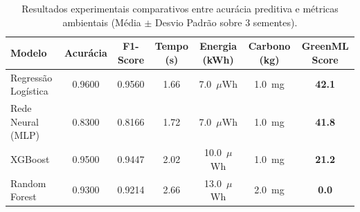 \begin{table}[htbp]
\centering
\small
\caption{Resultados experimentais comparativos entre acurácia preditiva e métricas ambientais (Média $\pm$ Desvio Padrão sobre 3 sementes).}
\label{tab:resultados_greenml}
\begin{tabular}{lcccccc}
\toprule
\textbf{Modelo} & \textbf{Acurácia} & \textbf{F1-Score} & \textbf{Tempo (s)} & \textbf{Energia (kWh)} & \textbf{Carbono (kg)} & \textbf{GreenML Score} \\
\midrule
Regressão Logística & 0.9600 & 0.9560 & 1.66 & 7.0~$\mu$Wh & 1.0~mg & \textbf{42.1} \\
Rede Neural (MLP) & 0.8300 & 0.8166 & 1.72 & 7.0~$\mu$Wh & 1.0~mg & \textbf{41.8} \\
XGBoost & 0.9500 & 0.9447 & 2.02 & 10.0~$\mu$Wh & 1.0~mg & \textbf{21.2} \\
Random Forest & 0.9300 & 0.9214 & 2.66 & 13.0~$\mu$Wh & 2.0~mg & \textbf{0.0} \\
\bottomrule
\end{tabular}
\end{table}
